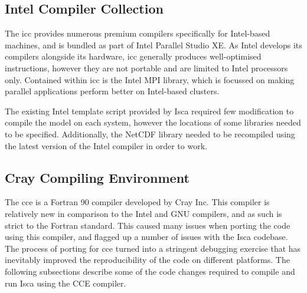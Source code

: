 \documentclass[a4paper,11pt]{report}
\begin{document}
\subsection{Intel Compiler Collection}
The \gls{icc} provides numerous premium compilers specifically for Intel-based machines, and is bundled as part of Intel Parallel Studio XE. As Intel develops its compilers alongside its hardware, \gls{icc} generally produces well-optimised instructions, however they are not portable and are limited to Intel processors only. Contained within \gls{icc} is the Intel MPI library, which is focussed on making parallel applications perform better on Intel-based clusters.
\par
The existing Intel template script provided by Isca required few modification to compile the model on each system, however the locations of some libraries needed to be specified. Additionally, the NetCDF library needed to be recompiled using the latest version of the Intel compiler in order to work. 


\subsection{Cray Compiling Environment}
The \gls{cce} is a Fortran 90 compiler developed by Cray Inc. This compiler is relatively new in comparison to the Intel and GNU compilers, and as such is strict to the Fortran standard. This caused many issues when porting the code using this compiler, and flagged up a number of issues with the Isca codebase. The process of porting for \gls{cce} turned into a stringent debugging exercise that has inevitably improved the reproducibility of the code on different platforms. The following subsections describe some of the code changes required to compile and run Isca using the CCE compiler.
\end{document}
